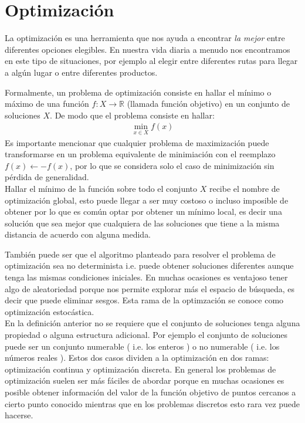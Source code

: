 \section{Optimización}
La optimización es una herramienta que nos ayuda a encontrar \textit{la mejor} entre diferentes opciones elegibles. En nuestra vida diaria a menudo nos encontramos en este tipo de situaciones, por ejemplo al elegir entre diferentes rutas para llegar a algún lugar o entre diferentes productos.

Formalmente, un problema de optimización consiste en hallar el mínimo o máximo de una función $f:X\rightarrow \mathbb{R}$ (llamada función objetivo) en un conjunto de soluciones $X$. De modo que el problema consiste en hallar:
\begin{gather}
\min_{x\in X} f(x)
\end{gather}
Es importante mencionar que cualquier problema de maximización puede transformarse en un problema equivalente de minimiación con el reemplazo $f(x) \leftarrow -f(x)$, por lo que se considera solo el caso de minimización sin pérdida de generalidad.\\

Hallar el mínimo de la función sobre todo el conjunto $X$ recibe el nombre de optimización global, esto puede llegar a ser muy costoso o incluso imposible de obtener por lo que es común optar por obtener un mínimo local, es decir una solución que sea mejor que cualquiera de las soluciones que tiene a la misma distancia de acuerdo con alguna medida.

También puede ser que el algoritmo planteado para resolver el problema de optimización sea no determinista i.e. puede obtener soluciones diferentes aunque tenga las mismas condiciones iniciales. En muchas ocasiones es ventajoso tener algo de aleatoriedad porque nos permite explorar más el espacio de búsqueda, es decir que puede eliminar sesgos. Esta rama de la optimzación se conoce como optimización estocástica.
\\ En la definición anterior no se requiere que el conjunto de soluciones tenga alguna propiedad o alguna estructura adicional. Por ejemplo el conjunto de soluciones puede ser un conjunto numerable ( i.e. los enteros ) o no numerable ( i.e. los números reales ). Estos dos casos dividen a la optimización en dos ramas: optimización continua y optimización discreta. En general los problemas de optimización suelen ser más fáciles de abordar\cite{nocedal2006numerical} porque en muchas ocasiones es posible obtener información del valor de la función objetivo de puntos cercanos a cierto punto conocido mientras que en los problemas discretos esto rara vez puede hacerse.\\

